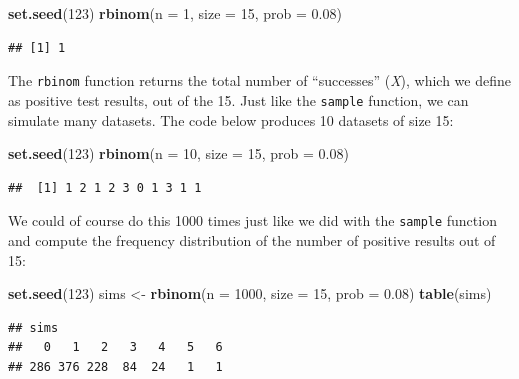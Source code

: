 \documentclass[
]{book}
\newenvironment{Shaded}{\begin{snugshade}}{\end{snugshade}}
\newcommand{\AttributeTok}[1]{\textcolor[rgb]{0.13,0.29,0.53}{#1}}
\newcommand{\DecValTok}[1]{\textcolor[rgb]{0.00,0.00,0.81}{#1}}
\newcommand{\FloatTok}[1]{\textcolor[rgb]{0.00,0.00,0.81}{#1}}
\newcommand{\FunctionTok}[1]{\textcolor[rgb]{0.13,0.29,0.53}{\textbf{#1}}}
\newcommand{\NormalTok}[1]{#1}
\newcommand{\OtherTok}[1]{\textcolor[rgb]{0.56,0.35,0.01}{#1}}
\begin{document}
\begin{Shaded}
\begin{Highlighting}[]
\FunctionTok{set.seed}\NormalTok{(}\DecValTok{123}\NormalTok{)}
\FunctionTok{rbinom}\NormalTok{(}\AttributeTok{n =} \DecValTok{1}\NormalTok{, }\AttributeTok{size =} \DecValTok{15}\NormalTok{, }\AttributeTok{prob =} \FloatTok{0.08}\NormalTok{)}
\end{Highlighting}
\end{Shaded}

\begin{verbatim}
## [1] 1
\end{verbatim}

The \texttt{rbinom} function returns the total number of ``successes'' (\emph{X}),
which we define as positive test results, out of the 15. Just like the
\texttt{sample} function, we can simulate many datasets. The code below
produces 10 datasets of size 15:

\begin{Shaded}
\begin{Highlighting}[]
\FunctionTok{set.seed}\NormalTok{(}\DecValTok{123}\NormalTok{)}
\FunctionTok{rbinom}\NormalTok{(}\AttributeTok{n =} \DecValTok{10}\NormalTok{, }\AttributeTok{size =} \DecValTok{15}\NormalTok{, }\AttributeTok{prob =} \FloatTok{0.08}\NormalTok{)}
\end{Highlighting}
\end{Shaded}

\begin{verbatim}
##  [1] 1 2 1 2 3 0 1 3 1 1
\end{verbatim}

We could of course do this 1000 times just like we did with the \texttt{sample}
function and compute the frequency distribution of the number of
positive results out of 15:

\begin{Shaded}
\begin{Highlighting}[]
\FunctionTok{set.seed}\NormalTok{(}\DecValTok{123}\NormalTok{)}
\NormalTok{sims }\OtherTok{\textless{}{-}} \FunctionTok{rbinom}\NormalTok{(}\AttributeTok{n =} \DecValTok{1000}\NormalTok{, }\AttributeTok{size =} \DecValTok{15}\NormalTok{, }\AttributeTok{prob =} \FloatTok{0.08}\NormalTok{)}
\FunctionTok{table}\NormalTok{(sims)}
\end{Highlighting}
\end{Shaded}

\begin{verbatim}
## sims
##   0   1   2   3   4   5   6 
## 286 376 228  84  24   1   1
\end{verbatim}
\end{document}
